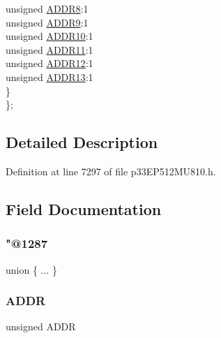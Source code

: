 \begin{DoxyCompactItemize}
\begin{tabbing}
\>\>unsigned \hyperlink{structtag_p_m_a_d_d_r_b_i_t_s_afced7180e90ecea43d2c2a985d99d3d6}{ADDR8}:1\\
\>\>unsigned \hyperlink{structtag_p_m_a_d_d_r_b_i_t_s_a48027128d2bc0eaa0a7ba769f26d0d45}{ADDR9}:1\\
\>\>unsigned \hyperlink{structtag_p_m_a_d_d_r_b_i_t_s_aa1822eec276bbfaf3cb47bb28ce1bcf3}{ADDR10}:1\\
\>\>unsigned \hyperlink{structtag_p_m_a_d_d_r_b_i_t_s_a34135996c555ad3570d9eb04396fb129}{ADDR11}:1\\
\>\>unsigned \hyperlink{structtag_p_m_a_d_d_r_b_i_t_s_ac2cfb0a4fdea1ea2d7eab15e9294d5cc}{ADDR12}:1\\
\>\>unsigned \hyperlink{structtag_p_m_a_d_d_r_b_i_t_s_ac15b4e791b5e2127d193508e6d36b574}{ADDR13}:1\\
\>\} \\
\}; \\

\end{tabbing}\end{DoxyCompactItemize}


\subsection{Detailed Description}


Definition at line 7297 of file p33\+E\+P512\+M\+U810.\+h.



\subsection{Field Documentation}
\mbox{\label{structtag_p_m_a_d_d_r_b_i_t_s_a7a04d9d720305e4ac1387b92a0d4a238}} 
\subsubsection{\texorpdfstring{"@1287}{@1287}}
{\footnotesize\ttfamily union \{ ... \} }

\mbox{\label{structtag_p_m_a_d_d_r_b_i_t_s_a086bf948e86b578064844ddab11f4a23}} 
\subsubsection{\texorpdfstring{A\+D\+DR}{ADDR}}
{\footnotesize\ttfamily unsigned A\+D\+DR}




